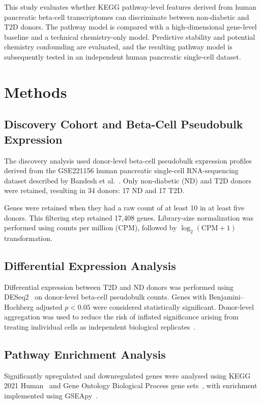 \documentclass[conference]{IEEEtran}
\begin{document}
This study evaluates whether KEGG pathway-level features derived from human pancreatic beta-cell transcriptomes can discriminate between non-diabetic and T2D donors. The pathway model is compared with a high-dimensional gene-level baseline and a technical chemistry-only model. Predictive stability and potential chemistry confounding are evaluated, and the resulting pathway model is subsequently tested in an independent human pancreatic single-cell dataset.

\section{Methods}

\subsection{Discovery Cohort and Beta-Cell Pseudobulk Expression}

The discovery analysis used donor-level beta-cell pseudobulk expression profiles derived from the GSE221156 human pancreatic single-cell RNA-sequencing dataset described by Bandesh et al.~\cite{bandesh2026}. Only non-diabetic (ND) and T2D donors were retained, resulting in 34 donors: 17 ND and 17 T2D.

Genes were retained when they had a raw count of at least 10 in at least five donors. This filtering step retained 17,408 genes. Library-size normalization was performed using counts per million (CPM), followed by $\log_2(\mathrm{CPM}+1)$ transformation.

\subsection{Differential Expression Analysis}

Differential expression between T2D and ND donors was performed using DESeq2~\cite{love2014} on donor-level beta-cell pseudobulk counts. Genes with Benjamini--Hochberg adjusted $p<0.05$ were considered statistically significant.
Donor-level aggregation was used to reduce the risk of inflated significance arising from treating individual cells as independent biological replicates~\cite{squair2021}.
\subsection{Pathway Enrichment Analysis}

Significantly upregulated and downregulated genes were analysed using KEGG 2021 Human~\cite{kanehisa2000} and Gene Ontology Biological Process gene sets~\cite{go2021}, with enrichment implemented using GSEApy~\cite{fang2023}.
\end{document}
